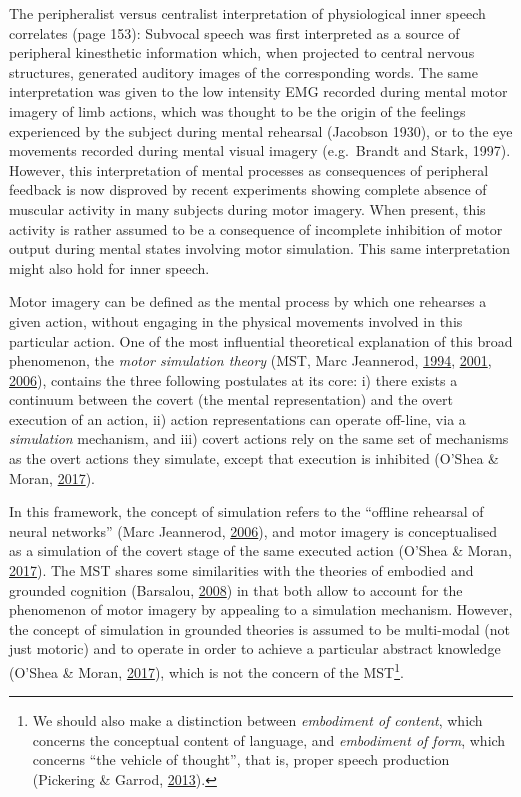 \documentclass[a4paper,12pt,twoside,openright,oldfontcommands]{memoir}
\let\rmarkdownfootnote\footnote%
\def\footnote{\protect\rmarkdownfootnote}
\begin{document}
The peripheralist versus centralist interpretation of physiological
inner speech correlates (page 153): Subvocal speech was first
interpreted as a source of peripheral kinesthetic information which,
when projected to central nervous structures, generated auditory images
of the corresponding words. The same interpretation was given to the low
intensity EMG recorded during mental motor imagery of limb actions,
which was thought to be the origin of the feelings experienced by the
subject during mental rehearsal (Jacobson 1930), or to the eye movements
recorded during mental visual imagery (e.g.~Brandt and Stark, 1997).
However, this interpretation of mental processes as consequences of
peripheral feedback is now disproved by recent experiments showing
complete absence of muscular activity in many subjects during motor
imagery. When present, this activity is rather assumed to be a
consequence of incomplete inhibition of motor output during mental
states involving motor simulation. This same interpretation might also
hold for inner speech.

Motor imagery can be defined as the mental process by which one
rehearses a given action, without engaging in the physical movements
involved in this particular action. One of the most influential
theoretical explanation of this broad phenomenon, the \emph{motor
simulation theory} (MST, Marc Jeannerod,
\protect\hyperlink{ref-jeannerod_representing_1994}{1994},
\protect\hyperlink{ref-jeannerod_neural_2001}{2001},
\protect\hyperlink{ref-jeannerod_motor_2006}{2006}), contains the three
following postulates at its core: i) there exists a continuum between
the covert (the mental representation) and the overt execution of an
action, ii) action representations can operate off-line, via a
\emph{simulation} mechanism, and iii) covert actions rely on the same
set of mechanisms as the overt actions they simulate, except that
execution is inhibited (O'Shea \& Moran,
\protect\hyperlink{ref-oshea_does_2017}{2017}).

In this framework, the concept of simulation refers to the ``offline
rehearsal of neural networks'' (Marc Jeannerod,
\protect\hyperlink{ref-jeannerod_motor_2006}{2006}), and motor imagery
is conceptualised as a simulation of the covert stage of the same
executed action (O'Shea \& Moran,
\protect\hyperlink{ref-oshea_does_2017}{2017}). The MST shares some
similarities with the theories of embodied and grounded cognition
(Barsalou, \protect\hyperlink{ref-Barsalou2008}{2008}) in that both
allow to account for the phenomenon of motor imagery by appealing to a
simulation mechanism. However, the concept of simulation in grounded
theories is assumed to be multi-modal (not just motoric) and to operate
in order to achieve a particular abstract knowledge (O'Shea \& Moran,
\protect\hyperlink{ref-oshea_does_2017}{2017}), which is not the concern
of the MST\footnote{We should also make a distinction between
  \emph{embodiment of content}, which concerns the conceptual content of
  language, and \emph{embodiment of form}, which concerns ``the vehicle
  of thought'', that is, proper speech production (Pickering \& Garrod,
  \protect\hyperlink{ref-pickering_integrated_2013}{2013}).}.
\end{document}
